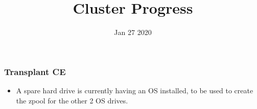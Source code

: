 \documentclass{beamer}
\title{Cluster Progress}
\date{Jan 27 2020}
\begin{document}

\begin{frame}
  \maketitle
\end{frame}


\begin{frame}
  \frametitle{Transplant CE}

  \begin{itemize}
  \item A spare hard drive is currently having an OS installed, to be used to create the zpool for the other 2 OS drives.

  \end{itemize}
\end{frame}



\end{document}
